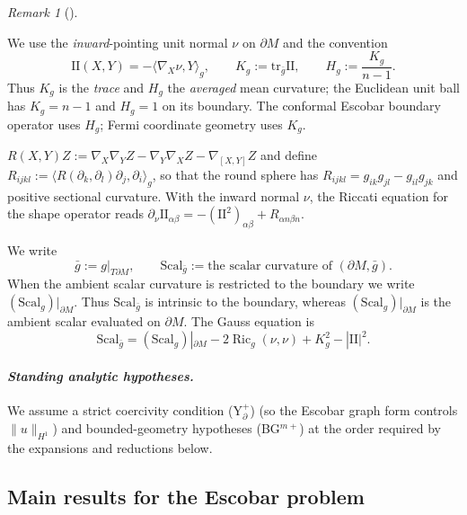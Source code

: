 \documentclass[11pt,reqno,a4paper]{amsart}
\DeclareMathOperator{\Ric}{Ric}
\numberwithin{equation}{section}
\theoremstyle{plain}
\newcommand{\Scal}{\mathrm{Scal}}
\theoremstyle{remark}
\newtheorem{remark}[theorem]{Remark}
\theoremstyle{plain}
\begin{document}
\begin{remark}[]\label{rem:intro-H-convention}

We use the \emph{inward}-pointing unit normal $\nu$ on $\partial M$ and the convention
\[
\mathrm{II}(X,Y) = -\langle \nabla_X \nu, Y \rangle_g,\qquad
K_g := \mathrm{tr}_{\bar g}\mathrm{II},\qquad
H_g := \frac{K_g}{n-1}.
\]
Thus $K_g$ is the \emph{trace} and $H_g$ the \emph{averaged} mean curvature; the Euclidean unit ball has $K_g=n-1$ and $H_g=1$ on its boundary.
The conformal Escobar boundary operator uses $H_g$; Fermi coordinate geometry uses $K_g$.

\smallskip
{} $R(X,Y)Z:=\nabla_X\nabla_YZ-\nabla_Y\nabla_XZ-\nabla_{[X,Y]}Z$
and define $R_{ijkl}:=\langle R(\partial_k,\partial_l)\partial_j,\partial_i\rangle_g$, so that the round sphere has
$R_{ijkl}=g_{ik}g_{jl}-g_{il}g_{jk}$ and positive sectional curvature.
With the inward normal $\nu$, the Riccati equation for the shape operator reads
$\partial_\nu\mathrm{II}_{\alpha\beta}=-(\mathrm{II}^2)_{\alpha\beta}+R_{\alpha n\beta n}$.

\smallskip
{}
We write
\[
\bar g:=g|_{T\partial M},
\qquad
\Scal_{\bar g}:=\text{the scalar curvature of }(\partial M,\bar g).
\]
When the ambient scalar curvature is restricted to the boundary we write
$(\Scal_g)|_{\partial M}$.  Thus $\Scal_{\bar g}$ is intrinsic to the boundary,
whereas $(\Scal_g)|_{\partial M}$ is the ambient scalar evaluated on
$\partial M$.  The Gauss equation is
\[
\Scal_{\bar g}=(\Scal_g)|_{\partial M}-2\Ric_g(\nu,\nu)+K_g^2-|\mathrm{II}|^2 .
\]
\end{remark}

\paragraph{\emph{Standing analytic hypotheses.}}
We assume a strict coercivity condition \textup{(Y$^+_{\partial}$)} (so the Escobar graph form controls $\|u\|_{H^1}$)
and bounded-geometry hypotheses \textup{(BG$^{m+}$)} at the order required by the expansions and reductions below.


\subsection{Main results for the Escobar problem}
\end{document}
